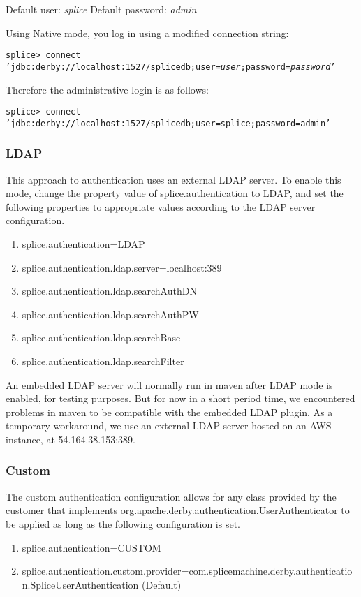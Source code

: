 \documentclass{article}
\begin{document}
Default user:  \emph{splice}    
Default password: \emph{admin}

Using Native mode, you log in using a modified connection string:

\texttt{splice> connect 'jdbc:derby://localhost:1527/splicedb;user=\emph{user};password=\emph{password}'}

Therefore the administrative login is as follows:

\texttt{splice> connect 'jdbc:derby://localhost:1527/splicedb;user=splice;password=admin'}

\subsubsection{LDAP}
This approach to authentication uses an external LDAP server. To enable this mode, change the property value of splice.authentication to LDAP, and set the following properties to appropriate values according to the LDAP server configuration. 
\begin{enumerate}
        \item splice.authentication=LDAP
        \item splice.authentication.ldap.server=localhost:389
        \item splice.authentication.ldap.searchAuthDN
        \item splice.authentication.ldap.searchAuthPW
        \item splice.authentication.ldap.searchBase
        \item splice.authentication.ldap.searchFilter
\end{enumerate}
An embedded LDAP server will normally run in maven after LDAP mode is enabled, for testing purposes. But for now in a short period time, we encountered problems in maven to be compatible with the embedded LDAP plugin. As a temporary workaround, we use an external LDAP server hosted on an AWS instance, at 54.164.38.153:389. 

\subsubsection{Custom}

The custom authentication
configuration allows for any
class provided by the customer
that implements org.apache.derby.authentication.UserAuthenticator
to be applied as long as the following configuration is set.

\begin{enumerate}
        \item splice.authentication=CUSTOM
        \item   splice.authentication.custom.provider=com.splicemachine.derby.authentication.SpliceUserAuthentication (Default)
\end{enumerate}
\end{document}
